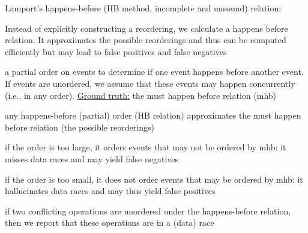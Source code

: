 \documentclass[landscape, a4paper]{article}
\begin{document}
\begin{minipage}[t]{0.2\linewidth}
	\begin{betterlist}
		\item Lamport's \alert{happens-before (HB method, incomplete and unsound) relation}:
		\begin{betterlist}
			\item Instead of explicitly constructing a reordering, we calculate a happens before relation. It approximates the possible reorderings and thus can be computed efficiently but may lead to \alert{false positives} and \alert{false negatives}%
			\item \alert{a partial order} on events to determine if one event happens before another event. If events are unordered, we assume that these events may happen concurrently (i.e., in any order). \uline{Ground truth:} the \alert{must happen before relation (mhb)}
			\item any \alert{happens-before (partial) order} (HB relation) approximates the must happen before relation (the possible reorderings)
			\begin{betterlist}
				\item if the order is \alert{too large}, it orders events that may not be ordered by mhb: it misses data races and may yield false negatives
				\item if the order is \alert{too small}, it does not order events that may be ordered by mhb: it hallucinates data races and may thus yield false positives
			\end{betterlist}
			\item if two conflicting operations are unordered under the happens-before relation, then we report that these operations are in a (data) race

\end{betterlist}
\end{betterlist}
\end{minipage}
\end{document}
